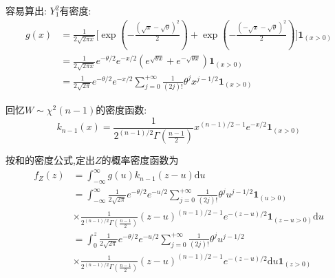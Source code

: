 	\begin{frame}
		容易算出: $Y_1^2$有密度:
		\begin{equation}
			\begin{split}
				g(x) &= \frac{1}{2\sqrt{2\pi x}}\bigg[\exp(-\frac{(\sqrt{x}-\sqrt{\theta})^2}{2})+\exp(-\frac{(-\sqrt{x}-\sqrt{\theta})^2}{2})\bigg]\bm{1}_{(x>0)} \\
				&= \frac{1}{2\sqrt{2\pi x}} e^{-\theta/2}e^{-x/2}(e^{\sqrt{\theta x}}+e^{-\sqrt{\theta x}})\bm{1}_{(x>0)} \\
				&= \frac{1}{2\sqrt{2\pi }} e^{-\theta/2}e^{-x/2}\sum_{j=0}^{+\infty}\frac{1}{(2j)!}\theta^{j}x^{j-1/2}\bm{1}_{(x>0)}
			\end{split}
		\end{equation}
		
		回忆$W\sim\chi^2(n-1)$的密度函数:
		\begin{equation}
			k_{n-1}(x) = \frac{1}{2^{(n-1)/2}\Gamma(\frac{n-1}{2})}x^{(n-1)/2-1}e^{-x/2}\bm{1}_{(x>0)}
		\end{equation}
	\end{frame}

	\begin{frame}
		按和的密度公式,定出$Z$的概率密度函数为
		\begin{equation}
			\begin{split}
				f_Z(z) &= \int_{-\infty}^{\infty}g(u)k_{n-1}(z-u)\mathrm{d}u \\
				&= \int_{-\infty}^{\infty}\frac{1}{2\sqrt{2\pi }} e^{-\theta/2}e^{-u/2}\sum_{j=0}^{+\infty}\frac{1}{(2j)!}\theta^{j}u^{j-1/2}\bm{1}_{(u>0)} \\
				&\times\frac{1}{2^{(n-1)/2}\Gamma(\frac{n-1}{2})}(z-u)^{(n-1)/2-1}e^{-(z-u)/2}\bm{1}_{(z-u>0)}\mathrm{d}u \\
				&= \int_{0}^{z}\frac{1}{2\sqrt{2\pi }} e^{-\theta/2}e^{-u/2}\sum_{j=0}^{+\infty}\frac{1}{(2j)!}\theta^{j}u^{j-1/2}\\
				&\times\frac{1}{2^{(n-1)/2}\Gamma(\frac{n-1}{2})}(z-u)^{(n-1)/2-1}e^{-(z-u)/2}\mathrm{d}u \bm{1}_{(z>0)}
			\end{split}
		\end{equation}
	\end{frame}

